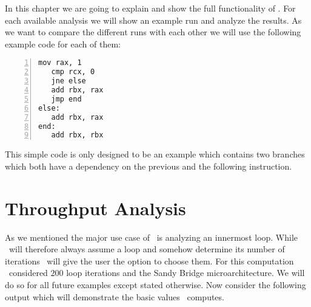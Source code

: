 In this chapter we are going to explain and show the full functionality of \suaca. For each available analysis we will show an example run and analyze the results. As we want to compare the different runs with each other we will use the following example code for each of them:

\begin{mdframed}[backgroundcolor=light-gray, roundcorner=10pt,leftmargin=1, rightmargin=1, innerleftmargin=15, innertopmargin=1,innerbottommargin=1, outerlinewidth=1, linecolor=light-gray]
\begin{lstlisting}[language={myLang}, basicstyle=\small, numbers=left]
   mov rax, 1
   cmp rcx, 0
   jne else
   add rbx, rax
   jmp end
else:
   add rbx, rax
end:
   add rbx, rbx
\end{lstlisting}
\end{mdframed}

This simple code is only designed to be an example which contains two branches which both have a dependency on the previous and the following instruction.

\section{Throughput Analysis}
\label{sec:plain}

As we mentioned the major use case of \iaca\ is analyzing an innermost loop. While \iaca\ will therefore always assume a loop and somehow determine its number of iterations \suaca\ will give the user the option to choose them. For this computation \suaca\ considered $200$ loop iterations and the Sandy Bridge microarchitecture. We will do so for all future examples except stated otherwise. Now consider the following output which will demonstrate the basic values \suaca\ computes.



